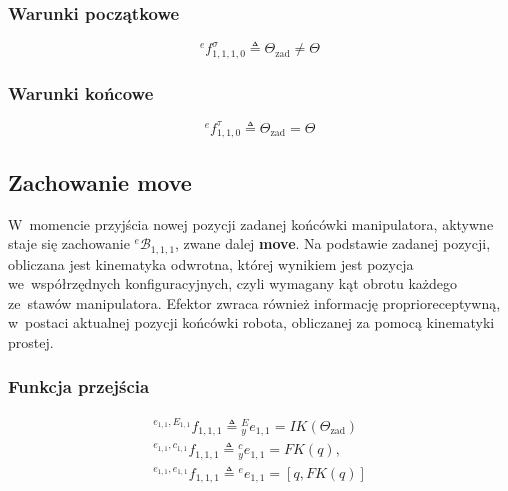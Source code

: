 \subsubsection{Warunki początkowe}
\begin{equation}
    {}^{e}f^{\sigma}_{1,1,1,0} \triangleq \Theta_{\mathrm{zad}} \neq \Theta
\end{equation}

\subsubsection{Warunki końcowe}
\begin{equation}
    {}^{e}f^{\tau}_{1,1,0} \triangleq \Theta_{\mathrm{zad}} = \Theta
\end{equation}


\subsection{Zachowanie move}
\label{subsec:ve-manip-move}

W~momencie przyjścia nowej pozycji zadanej końcówki manipulatora, aktywne staje się zachowanie ${}^{e}\mathcal{B}_{1,1,1}$, zwane dalej \textbf{move}. Na podstawie zadanej pozycji, obliczana jest kinematyka odwrotna, której wynikiem jest pozycja we~współrzędnych konfiguracyjnych, czyli wymagany kąt obrotu każdego ze~stawów manipulatora. Efektor zwraca również informację proprioreceptywną, w~postaci aktualnej pozycji końcówki robota, obliczanej za pomocą kinematyki prostej.

\subsubsection{Funkcja przejścia}
\begin{equation}
    \begin{gathered}
        {}^{e_{1,1}, E_{1,1}}f_{1,1,1} \triangleq {}^{E}_{y}e_{1,1} = IK(\Theta_{\mathrm{zad}})\\
        {}^{e_{1,1}, c_{1,1}}f_{1,1,1} \triangleq {}^{c}_{y}e_{1,1} = FK(q),\\
        {}^{e_{1,1}, e_{1,1}}f_{1,1,1} \triangleq {}^{e}e_{1,1} = [q, FK(q)]
    \end{gathered}
\end{equation}

